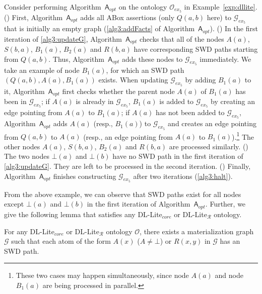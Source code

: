 \documentclass[final,1p,times]{elsarticle}
\begin{document}
Consider performing Algorithm~$\mathsf{A}_{opt}$ on the ontology $\mathcal{O}_{ex_5}$ in Example~\ref{exp:dllite}.
(\uppercase\expandafter{}) First, Algorithm~$\mathsf{A}_{opt}$ adds all ABox assertions (only $Q(a,b)$ here)
to $\mathcal{G}_{ex_5}$ that is initially an empty graph (\ref{alg3:addFacts} of Algorithm~$\mathsf{A}_{opt}$).
(\uppercase\expandafter{}) In the first iteration of
\ref{alg3:updateG}, Algorithm~$\mathsf{A}_{opt}$ checks that all of the nodes
$A(a)$, $S(b,a)$, $B_1(a)$, $B_2(a)$ and $R(b,a)$ have corresponding SWD paths
starting from $Q(a,b)$. Thus, Algorithm~$\mathsf{A}_{opt}$
adds these nodes to $\mathcal{G}_{ex_5}$ immediately. We take an example of node $B_1(a)$,
for which an SWD path $(Q(a,b),A(a),B_1(a))$ exists.
When updating $\mathcal{G}_{ex_5}$ by adding $B_1(a)$ to it,
Algorithm~$\mathsf{A}_{opt}$ first checks whether the parent node $A(a)$ of $B_1(a)$
has been in $\mathcal{G}_{ex_5}$; if $A(a)$ is already in $\mathcal{G}_{ex_5}$, $B_1(a)$
is added to $\mathcal{G}_{ex_5}$ by creating an edge pointing from $A(a)$ to $B_1(a)$;
if $A(a)$ has not been added to $\mathcal{G}_{ex_5}$, Algorithm~$\mathsf{A}_{opt}$ adds $A(a)$ (resp., $B_1(a)$)
to $\mathcal{G}_{ex_5}$ and creates an edge pointing from $Q(a,b)$ to $A(a)$ (resp.,
an edge pointing from $A(a)$ to $B_1(a)$).\footnote{These two cases may happen simultaneously,
since node $A(a)$ and node $B_1(a)$ are being processed in parallel.} The other nodes
$A(a)$, $S(b,a)$, $B_2(a)$ and $R(b,a)$ are processed similarly.
(\uppercase\expandafter{})
The two nodes $\bot(a)$ and $\bot(b)$
have no SWD path in the first iteration of \ref{alg3:updateG}.
They are left to be processed in the second iteration.
(\uppercase\expandafter{})
Finally, Algorithm~$\mathsf{A}_{opt}$ finishes constructing $\mathcal{G}_{ex_5}$
after two iterations (\ref{alg3:halt}).

From the above example, we can observe that SWD paths exist
for all nodes except $\bot(a)$ and $\bot(b)$ in the first iteration of Algorithm~$\mathsf{A}_{opt}$.
Further, we give the following lemma that satisfies any DL-Lite$_{core}$ or DL-Lite$_\mathcal{R}$ ontology.

\begin{lemma}\label{lemma:dllite}
For any DL-Lite$_{core}$ or DL-Lite$_\mathcal{R}$ ontology $\mathcal{O}$, there exists a materialization graph $\mathcal{G}$ such that
each atom of the form $A(x)$ ($A\neq\bot$) or $R(x,y)$ in $\mathcal{G}$ has an SWD path.
\end{lemma}
\end{document}
